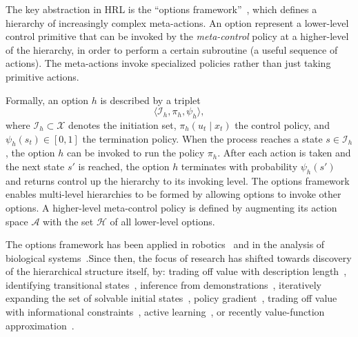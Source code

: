 The key abstraction in HRL is the ``options framework''~\cite{suttonPS99}, which defines a hierarchy of increasingly complex meta-actions.
 An option represent a lower-level control primitive that can be invoked by the \emph{meta-control} policy at a higher-level of the hierarchy, in order to perform a certain subroutine (a useful sequence of actions).
The meta-actions invoke specialized policies rather than just taking primitive actions.

 Formally, an option $h$ is described by a triplet \[\langle \mathcal{I}_h, \pi_h, \psi_h \rangle,\] where $\mathcal{I}_h \subset \mathcal{X}$ denotes the initiation set, $\pi_h(u_t \mid x_t)$ the control policy, and $\psi_h(s_t) \in [0,1]$ the termination policy. When the process reaches a state $s \in \mathcal{I}_h$, the option $h$ can be invoked to run the policy $\pi_h$. After each action is taken and the next state $s'$ is reached, the option $h$ terminates with probability $\psi_h(s')$ and returns control up the hierarchy to its invoking level. The options framework enables multi-level hierarchies to be formed by allowing options to invoke other options. A higher-level meta-control policy is defined by augmenting its action space $\mathcal{A}$ with the set $\mathcal{H}$ of all lower-level options. 

The options framework has been applied in robotics~\cite{konidarisKGB12, krishnan2016swirl, sermanet2016unsupervised} and in the analysis of biological systems~\cite{botvinick08,botvinick2009hierarchically,solway2014optimal,zacksKEH11,whitenFBL06}.Since then, the focus of research has shifted towards discovery of the hierarchical structure itself, by: trading off value with description length~\cite{thrunS94}, identifying transitional states~\cite{mcgovernB01,menacheMS02,simsekB04,stolle04,lakshminarayananKKR16}, inference from demonstrations~\cite{buiVW02,krishnan2015transition,daniel2012hierarchical,krishnan2016swirl}, iteratively expanding the set of solvable initial states~\cite{konidarisB09,konidarisKGB12}, policy gradient~\cite{LevyS11}, trading off value with informational constraints~\cite{geneweinLGB15,foxMT16,jonssonG16,florensaDA17}, active learning~\cite{hamidiTGF15}, or recently value-function approximation~\cite{baconHP16,heess2016learning,sharmaLR17}.



